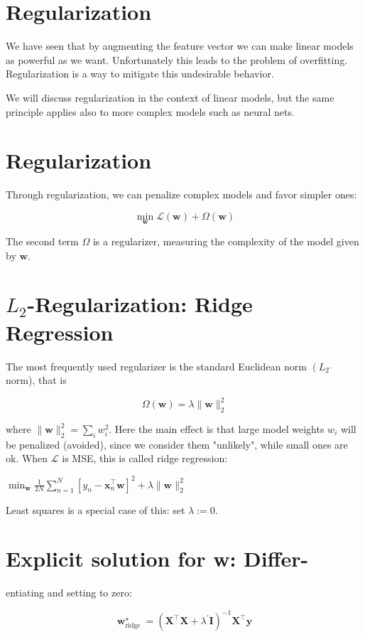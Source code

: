 
\section*{Regularization}
We have seen that by augmenting the feature vector we can make linear models as powerful as we want. Unfortunately this leads to the problem of overfitting. Regularization is a way to mitigate this undesirable behavior.

We will discuss regularization in the context of linear models, but the same principle applies also to more complex models such as neural nets.

\section*{Regularization}
Through regularization, we can penalize complex models and favor simpler ones:

$$
\min _{\mathbf{w}} \mathcal{L}(\mathbf{w})+\Omega(\mathbf{w})
$$

The second term $\Omega$ is a regularizer, measuring the complexity of the model given by $\mathbf{w}$.

\section*{$L_{2}$-Regularization: Ridge Regression}
The most frequently used regularizer is the standard Euclidean norm $\left(L_{2^{-}}\right.$ norm), that is

$$
\Omega(\mathbf{w})=\lambda\|\mathbf{w}\|_{2}^{2}
$$

where $\|\mathbf{w}\|_{2}^{2}=\sum_{i} w_{i}^{2}$. Here the main effect is that large model weights $w_{i}$ will be penalized (avoided), since we consider them "unlikely", while small ones are ok. When $\mathcal{L}$ is MSE, this is called ridge regression:

$\min _{\mathbf{w}} \frac{1}{2 N} \sum_{n=1}^{N}\left[y_{n}-\mathbf{x}_{n}^{\top} \mathbf{w}\right]^{2}+\lambda\|\mathbf{w}\|_{2}^{2}$

Least squares is a special case of this: set $\lambda:=0$.

\section*{Explicit solution for w: Differ-}
entiating and setting to zero:

$$
\mathbf{w}_{\text {ridge }}^{\star}=\left(\mathbf{X}^{\top} \mathbf{X}+\lambda^{\prime} \mathbf{I}\right)^{-1} \mathbf{X}^{\top} \mathbf{y}
$$

